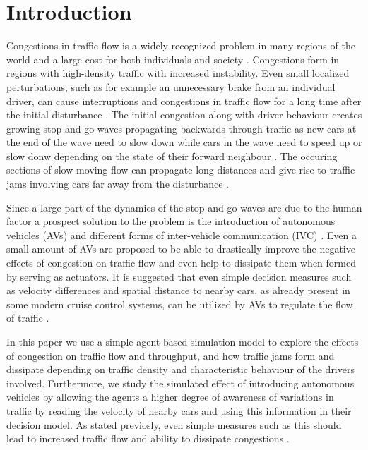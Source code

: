 \documentclass[11pt,a4paper,twocolumn]{article}
\begin{document}
\section{Introduction}
Congestions in traffic flow is a widely recognized problem in many regions of the world and a large cost for both individuals and society \cite{inrix}. Congestions form in regions with high-density traffic with increased instability. Even small localized perturbations, such as for example an unnecessary brake from an individual driver, can cause interruptions and congestions in traffic flow for a long time after the initial disturbance \cite{kerner97flow, bando1995dynamical}. The initial congestion along with driver behaviour creates growing stop-and-go waves propagating backwards through traffic as new cars at the end of the wave need to slow down while cars in the wave need to speed up or slow donw depending on the state of their forward neighbour  \cite{stern17autonomous, kerner96trafficjam}. The occuring sections of slow-moving flow can propagate long distances and give rise to traffic jams involving cars far away from the disturbance \cite{kerner96trafficjam}.

Since a large part of the dynamics of the stop-and-go waves are due to the human factor a prospect solution to the problem is the introduction of autonomous vehicles (AVs) and different forms of inter-vehicle communication (IVC) \cite{stern17autonomous, darbha1999cruisecontrol, bauza2013vehicle2vehicle, fagnant2015autonomous}. Even a small amount of AVs are proposed to be able to drastically improve the negative effects of congestion on traffic flow and even help to dissipate them when formed by serving as actuators. It is suggested that even simple decision measures such as velocity differences and spatial distance to nearby cars, as already present in some modern cruise control systems, can be utilized by AVs to regulate the flow of traffic \cite{stern17autonomous}.

In this paper we use a simple agent-based simulation model to explore the effects of congestion on traffic flow and throughput, and how traffic jams form and dissipate depending on traffic density and characteristic behaviour of the drivers involved. Furthermore, we study the simulated effect of introducing autonomous vehicles by allowing the agents a higher degree of awareness of variations in traffic by reading the velocity of nearby cars and using this information in their decision model. As stated previosly, even simple measures such as this should lead to increased traffic flow and ability to dissipate congestions \cite{stern17autonomous}. 
\end{document}
